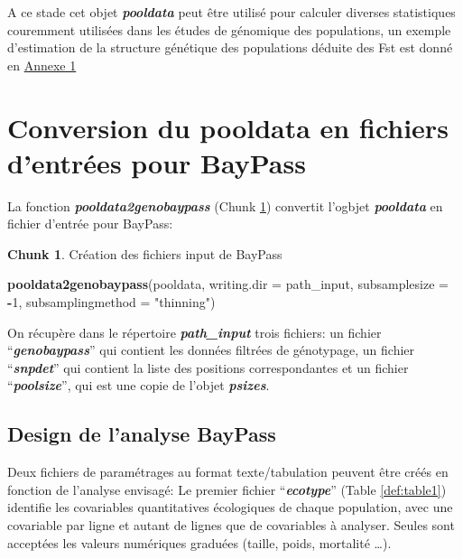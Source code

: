 \documentclass[
  openany]{book}
\newenvironment{Shaded}{\begin{snugshade}}{\end{snugshade}}
\newcommand{\AttributeTok}[1]{\textcolor[rgb]{0.13,0.29,0.53}{#1}}
\newcommand{\DecValTok}[1]{\textcolor[rgb]{0.00,0.00,0.81}{#1}}
\newcommand{\FunctionTok}[1]{\textcolor[rgb]{0.13,0.29,0.53}{\textbf{#1}}}
\newcommand{\NormalTok}[1]{#1}
\newcommand{\SpecialCharTok}[1]{\textcolor[rgb]{0.81,0.36,0.00}{\textbf{#1}}}
\newcommand{\StringTok}[1]{\textcolor[rgb]{0.31,0.60,0.02}{#1}}
\theoremstyle{definition}
\theoremstyle{definition}
\theoremstyle{definition}
\newtheorem{exercise}{Chunk}[chapter]
\theoremstyle{definition}
\theoremstyle{remark}
\begin{document}
A ce stade cet objet \textbf{\emph{pooldata}} peut être utilisé pour calculer diverses statistiques couremment utilisées dans les études de génomique des populations, un exemple d'estimation de la structure génétique des populations déduite des Fst est donné en \protect\hyperlink{An1}{Annexe 1}

\hypertarget{conversion-du-pooldata-en-fichiers-dentruxe9es-pour-baypass}{%
\chapter*{Conversion du pooldata en fichiers d'entrées pour BayPass}\label{conversion-du-pooldata-en-fichiers-dentruxe9es-pour-baypass}}

La fonction \textbf{\emph{pooldata2genobaypass}} (Chunk \ref{exr:chunk3}) convertit l'ogbjet \textbf{\emph{pooldata}} en fichier d'entrée pour BayPass:

\begin{exercise}
\protect\hypertarget{exr:chunk3}{}\label{exr:chunk3}{Création des fichiers input de BayPass}
\end{exercise}

\begin{Shaded}
\begin{Highlighting}[]
\FunctionTok{pooldata2genobaypass}\NormalTok{(pooldata, }\AttributeTok{writing.dir =}\NormalTok{ path\_input, }\AttributeTok{subsamplesize =} \SpecialCharTok{{-}}\DecValTok{1}\NormalTok{, }\AttributeTok{subsamplingmethod =} \StringTok{"thinning"}\NormalTok{)}
\end{Highlighting}
\end{Shaded}

On récupère dans le répertoire \textbf{\emph{path\_input}} trois fichiers: un fichier ``\textbf{\emph{genobaypass}}'' qui contient les données filtrées de génotypage, un fichier ``\textbf{\emph{snpdet}}'' qui contient la liste des positions correspondantes et un fichier ``\textbf{\emph{poolsize}}'', qui est une copie de l'objet \textbf{\emph{psizes}}.

\hypertarget{design-de-lanalyse-baypass}{%
\section*{Design de l'analyse BayPass}\label{design-de-lanalyse-baypass}}

Deux fichiers de paramétrages au format texte/tabulation peuvent être créés en fonction de l'analyse envisagé:
Le premier fichier ``\textbf{\emph{ecotype}}'' (Table \ref{def:table1}) identifie les covariables quantitatives écologiques de chaque population, avec une covariable par ligne et autant de lignes que de covariables à analyser. Seules sont acceptées les valeurs numériques graduées (taille, poids, mortalité \ldots).
\end{document}
